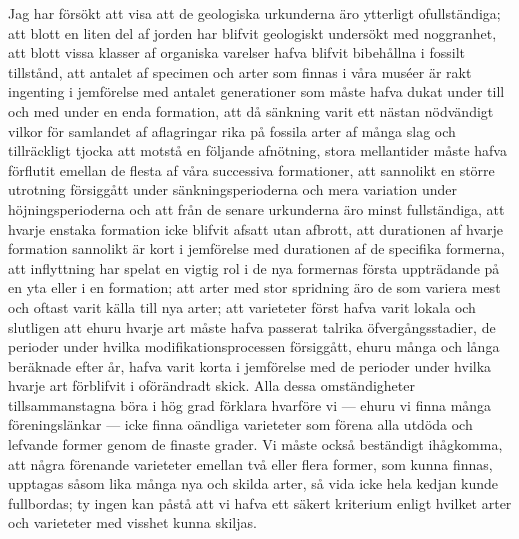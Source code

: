 Jag har försökt att visa att de geologiska urkunderna äro ytterligt ofullständiga; att blott en liten del af jorden har blifvit geologiskt undersökt med noggranhet, att blott vissa klasser af organiska varelser hafva blifvit bibehållna i fossilt tillstånd, att antalet af specimen och arter som finnas i våra muséer är rakt ingenting i jemförelse med antalet generationer som måste hafva dukat under till och med under en enda formation, att då sänkning varit ett nästan nödvändigt vilkor för samlandet af aflagringar rika på fossila arter af många slag och tillräckligt tjocka att motstå en följande afnötning, stora mellantider måste hafva förflutit emellan de flesta af våra successiva formationer, att sannolikt en större utrotning försiggått under sänkningsperioderna och mera variation under höjningsperioderna och att från de senare urkunderna äro minst fullständiga, att hvarje enstaka formation icke blifvit afsatt utan afbrott, att durationen af hvarje formation sannolikt är kort i jemförelse med durationen af de specifika formerna, att inflyttning har spelat en vigtig rol i de nya formernas första uppträdande på en yta eller i en formation; att arter med stor spridning äro de som variera mest och oftast varit källa till nya arter; att varieteter först hafva varit lokala och slutligen att ehuru hvarje art måste hafva passerat talrika öfvergångsstadier, de perioder under hvilka modifikationsprocessen försiggått, ehuru många och långa beräknade efter år, hafva varit korta i jemförelse med de perioder under hvilka hvarje art förblifvit i oförändradt skick. Alla dessa omständigheter tillsammanstagna böra i hög grad förklara hvarföre vi — ehuru vi finna många föreningslänkar — icke finna oändliga varieteter som förena alla utdöda och lefvande former genom de finaste grader. Vi måste också beständigt ihågkomma, att några förenande varieteter emellan två eller flera former, som kunna finnas, upptagas såsom lika många nya och skilda arter, så vida icke hela kedjan kunde fullbordas; ty ingen kan påstå att vi hafva ett säkert kriterium enligt hvilket arter och varieteter med visshet kunna skiljas.

